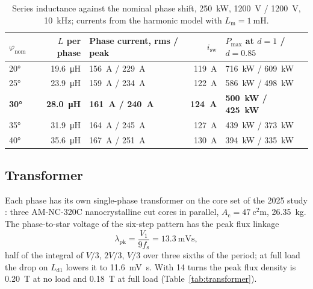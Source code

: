 \documentclass[12pt,a4paper]{scrartcl}
\newcommand{\ped}[1]{_{\mathrm{#1}}}
\begin{document}
\begin{onehalfspace}
\begin{table}[H]
	\centering
	\captionsetup{width=0.9\textwidth, font=small}
	\caption[Series inductance against the nominal phase shift.]{Series inductance against the nominal phase shift, \SI{250}{\kilo\watt}, \SI{1200}{\volt} / \SI{1200}{\volt}, \SI{10}{\kilo\hertz}; currents from the harmonic model with $L\ped{m} = \SI{1}{\milli\henry}$.}
	\label{tab:phinom}
	\small
	\begin{tabularx}{0.9\textwidth}{@{} l r X r X @{}}
		\toprule
		$\varphi\ped{nom}$ & $L$ per phase & Phase current, rms / peak & $i\ped{sw}$ & $P\ped{max}$ at $d = 1$ / $d = 0.85$ \\
		\midrule
		\ang{20} & \SI{19.6}{\micro\henry} & \SI{156}{\ampere} / \SI{229}{\ampere} & \SI{119}{\ampere} & \SI{716}{\kilo\watt} / \SI{609}{\kilo\watt} \\
		\ang{25} & \SI{23.9}{\micro\henry} & \SI{159}{\ampere} / \SI{234}{\ampere} & \SI{122}{\ampere} & \SI{586}{\kilo\watt} / \SI{498}{\kilo\watt} \\
		\textbf{\ang{30}} & \textbf{\SI{28.0}{\micro\henry}} & \textbf{\SI{161}{\ampere} / \SI{240}{\ampere}} & \textbf{\SI{124}{\ampere}} & \textbf{\SI{500}{\kilo\watt} / \SI{425}{\kilo\watt}} \\
		\ang{35} & \SI{31.9}{\micro\henry} & \SI{164}{\ampere} / \SI{245}{\ampere} & \SI{127}{\ampere} & \SI{439}{\kilo\watt} / \SI{373}{\kilo\watt} \\
		\ang{40} & \SI{35.6}{\micro\henry} & \SI{167}{\ampere} / \SI{251}{\ampere} & \SI{130}{\ampere} & \SI{394}{\kilo\watt} / \SI{335}{\kilo\watt} \\
		\bottomrule
	\end{tabularx}
\end{table}

\subsection{Transformer}
\label{sec:transformer}

Each phase has its own single-phase transformer on the core set of the 2025 study \cite{sst_doc}: three AM-NC-320C nanocrystalline cut cores in parallel, $A\ped{c} = \SI{47}{\square\centi\metre}$, \SI{26.35}{\kilogram}. The phase-to-star voltage of the six-step pattern has the peak flux linkage
\begin{equation}
	\lambda\ped{pk} = \frac{V\ped{1}}{9 f\ped{s}} = \SI{13.3}{\milli\volt\second},
	\label{eq:lambda}
\end{equation}
half of the integral of $V/3$, $2V/3$, $V/3$ over three sixths of the period; at full load the drop on $L\ped{d1}$ lowers it to \SI{11.6}{\milli\volt\second}. With 14 turns the peak flux density is \SI{0.20}{\tesla} at no load and \SI{0.18}{\tesla} at full load (Table~\ref{tab:transformer}).


\end{onehalfspace}
\end{document}
